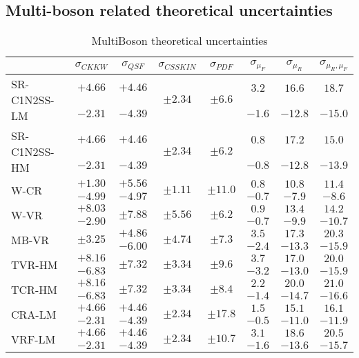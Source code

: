 \subsection*{Multi-boson related theoretical uncertainties}

\begin{table}[htpb!]
\centering %
\begin{tabular}{|l|c|c|c|c|c|c|c|}
\hline 
 & $\sigma_{CKKW}$ & $\sigma_{QSF}$ & $\sigma_{CSSKIN}$ & $\sigma_{PDF}$ & $\sigma_{\mu_{F}}$ & $\sigma_{\mu_{R}}$ & $\sigma_{\mu_{R},\mu_{F}}$\tabularnewline
\hline 
\multirow{2}{*}{SR-C1N2SS-LM} & $+4.66$ & $+4.46$ & \multirow{2}{*}{$\pm2.34$} & \multirow{2}{*}{$\pm6.6$} & $3.2$ & $16.6$ & $18.7$\tabularnewline
 & $-2.31$ & $-4.39$ &  &  & $-1.6$ & $-12.8$ & $-15.0$\tabularnewline
\hline 
\multirow{2}{*}{SR-C1N2SS-HM} & $+4.66$ & $+4.46$ & \multirow{2}{*}{$\pm2.34$} & \multirow{2}{*}{$\pm6.2$} & $0.8$ & $17.2$ & $15.0$\tabularnewline
 & $-2.31$ & $-4.39$ &  &  & $-0.8$ & $-12.8$ & $-13.9$\tabularnewline
\hline 
\multirow{2}{*}{W-CR} & $+1.30$ & $+5.56$ & \multirow{2}{*}{$\pm1.11$} & \multirow{2}{*}{$\pm11.0$} & $0.8$ & $10.8$ & $11.4$\tabularnewline
 & $-4.99$ & $-4.97$ &  &  & $-0.7$ & $-7.9$ & $-8.6$\tabularnewline
\hline 
\multirow{2}{*}{W-VR} & $+8.03$ & \multirow{2}{*}{$\pm7.88$} & \multirow{2}{*}{$\pm5.56$} & \multirow{2}{*}{$\pm6.2$} & $0.9$ & $13.4$ & $14.2$\tabularnewline
 & $-2.90$ &  &  &  & $-0.7$ & $-9.9$ & $-10.7$\tabularnewline
\hline 
\multirow{2}{*}{MB-VR} & \multirow{2}{*}{$\pm3.25$} & $+4.86$ & \multirow{2}{*}{$\pm4.74$} & \multirow{2}{*}{$\pm7.3$} & $3.5$ & $17.3$ & $20.3$\tabularnewline
 &  & $-6.00$ &  &  & $-2.4$ & $-13.3$ & $-15.9$\tabularnewline
\hline 
\multirow{2}{*}{TVR-HM} & $+8.16$ & \multirow{2}{*}{$\pm7.32$} & \multirow{2}{*}{$\pm3.34$} & \multirow{2}{*}{$\pm9.6$} & $3.7$ & $17.0$ & $20.0$\tabularnewline
 & $-6.83$ &  &  &  & $-3.2$ & $-13.0$ & $-15.9$\tabularnewline
\hline 
\multirow{2}{*}{TCR-HM} & $+8.16$ & \multirow{2}{*}{$\pm7.32$} & \multirow{2}{*}{$\pm3.34$} & \multirow{2}{*}{$\pm8.4$} & $2.2$ & $20.0$ & $21.0$\tabularnewline
 & $-6.83$ &  &  &  & $-1.4$ & $-14.7$ & $-16.6$\tabularnewline
\hline 
\multirow{2}{*}{CRA-LM} & $+4.66$ & $+4.46$ & \multirow{2}{*}{$\pm2.34$} & \multirow{2}{*}{$\pm17.8$} & $1.5$ & $15.1$ & $16.1$\tabularnewline
 & $-2.31$ & $-4.39$ &  &  & $-0.5$ & $-11.0$ & $-11.9$\tabularnewline
\hline 
\multirow{2}{*}{VRF-LM} & $+4.66$ & $+4.46$ & \multirow{2}{*}{$\pm2.34$} & \multirow{2}{*}{$\pm10.7$} & $3.1$ & $18.6$ & $20.5$\tabularnewline
 & $-2.31$ & $-4.39$ &  &  & $-1.6$ & $-13.6$ & $-15.7$\tabularnewline
\hline 
\end{tabular}\caption{MultiBoson theoretical uncertainties \label{tab:MB:SS:presel}}
\end{table}
\FloatBarrier
